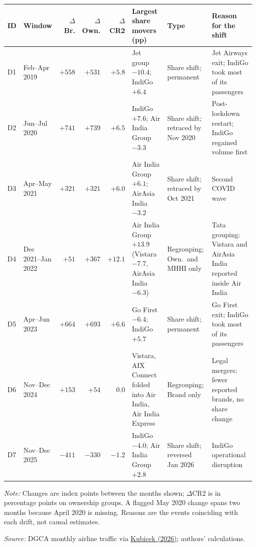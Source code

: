 \documentclass[12pt,a4paper]{article}
\begin{document}
{\begin{minipage}{\linewidth}
\label{tab:o1-drift}
\centering
{\footnotesize{}\setlength{\tabcolsep}{3pt}
\begin{tabular}{@{}lp{1.7cm}rrrp{2.7cm}p{1.9cm}p{2.9cm}@{}}
\toprule
ID & Window & $\Delta$Br. & $\Delta$Own. & $\Delta$CR2 & Largest share movers (pp) & Type & Reason for the shift \\
\midrule
D1 & Feb--Apr 2019 & $+558$ & $+531$ & $+5.8$ & Jet group $-10.4$; IndiGo $+6.4$ & Share shift; permanent & Jet Airways exit; IndiGo took most of its passengers \\
D2 & Jun--Jul 2020 & $+741$ & $+739$ & $+6.5$ & IndiGo $+7.6$; Air India Group $-3.3$ & Share shift; retraced by Nov 2020 & Post-lockdown restart; IndiGo regained volume first \\
D3 & Apr--May 2021 & $+321$ & $+321$ & $+6.0$ & Air India Group $+6.1$; AirAsia India $-3.2$ & Share shift; retraced by Oct 2021 & Second COVID wave \\
D4 & Dec 2021--Jan 2022 & $+51$ & $+367$ & $+12.1$ & Air India Group $+13.9$ (Vistara $-7.7$, AirAsia India $-6.3$) & Regrouping; Own.\ and MHHI only & Tata grouping: Vistara and AirAsia India reported inside Air India \\
D5 & Apr--Jun 2023 & $+664$ & $+693$ & $+6.6$ & Go First $-6.4$; IndiGo $+5.7$ & Share shift; permanent & Go First exit; IndiGo took most of its passengers \\
D6 & Nov--Dec 2024 & $+153$ & $+54$ & $0.0$ & Vistara, AIX Connect folded into Air India, Air India Express & Regrouping; Brand only & Legal mergers; fewer reported brands, no share change \\
D7 & Nov--Dec 2025 & $-411$ & $-330$ & $-1.2$ & IndiGo $-4.0$; Air India Group $+2.8$ & Share shift; reversed Jan 2026 & IndiGo operational disruption \parencite{moca2026indigo} \\
\bottomrule
\end{tabular}\par}
\vspace{4pt}
{\footnotesize{}\raggedright\textit{Note:} Changes are index points between the months shown; $\Delta$CR2 is in percentage points on ownership groups. A flagged May 2020 change spans two months because April 2020 is missing. Reasons are the events coinciding with each drift, not causal estimates.\par
\textit{Source:} DGCA monthly airline traffic via \href{https://github.com/mkubicek/india-aviation-stats/tree/16770ac59dae61ce7b80fd8bd67dd7f4cef280a6}{Kubicek (2026)}; authors' calculations.\par}
\end{minipage}

}
\end{document}
